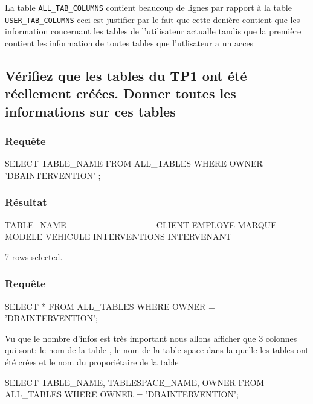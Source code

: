 \documentclass[•]{article}
\begin{document}
La table \texttt{ALL\_TAB\_COLUMNS} contient beaucoup de lignes par rapport à la table \texttt{USER\_TAB\_COLUMNS}
ceci est justifier par le fait que cette denière contient que les information concernant les tables de l'utilisateur actualle 
tandis que la première contient  les information de toutes tables que l'utlisateur a un acces

\subsection{Vérifiez que les tables du TP1 ont été réellement créées. Donner toutes les informations sur ces tables}
\subsubsection{Requête}
\begin{sql}
SELECT TABLE_NAME  FROM ALL_TABLES WHERE OWNER = 'DBAINTERVENTION' ;
\end{sql}
\subsubsection{Résultat}
\begin{sql}
TABLE_NAME
------------------------------
CLIENT
EMPLOYE
MARQUE
MODELE
VEHICULE
INTERVENTIONS
INTERVENANT

7 rows selected.
\end{sql}
\subsubsection{Requête}

\begin{sql}
SELECT * FROM ALL_TABLES WHERE OWNER = 'DBAINTERVENTION';
\end{sql}
Vu que le nombre d'infos est très important nous allons afficher que 3 colonnes qui sont: le nom de la table , le nom de la table space dans la quelle les tables ont été crées et le nom du proporiétaire de la table
\begin{sql}
SELECT TABLE_NAME, TABLESPACE_NAME, OWNER FROM ALL_TABLES WHERE OWNER = 'DBAINTERVENTION';
\end{sql}
\end{document}
